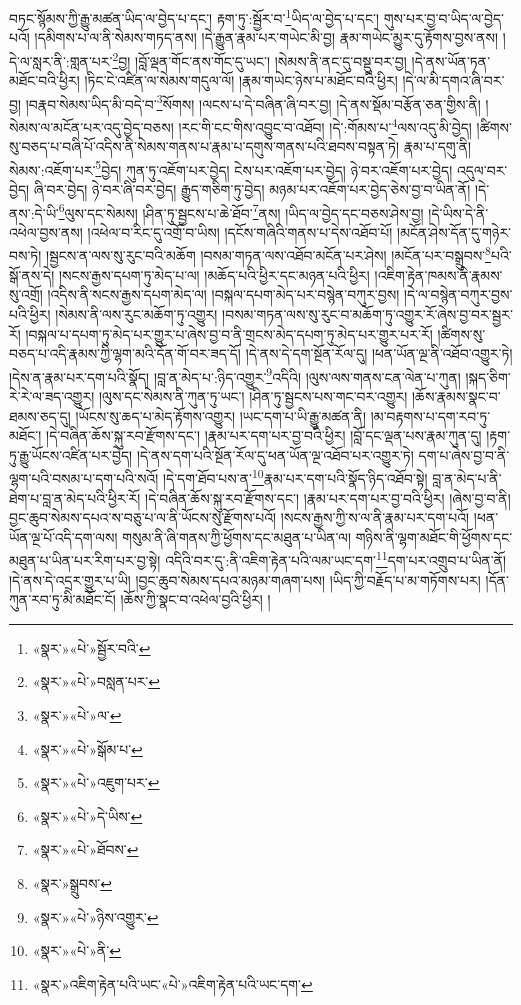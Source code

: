 བཏང་སྙོམས་ཀྱི་རྒྱུ་མཚན་ཡིད་ལ་བྱེད་པ་དང་། རྟག་ཏུ་:སྦྱོར་བ་\footnote{«སྣར་»«པེ་»སྦྱོར་བའི་}ཡིད་ལ་བྱེད་པ་དང་། གུས་པར་བྱ་བ་ཡིད་ལ་བྱེད་པའོ། །དམིགས་པ་ལ་ནི་སེམས་གཏད་ནས། །དེ་རྒྱུན་རྣམ་པར་གཡེང་མི་བྱ། རྣམ་གཡེང་མྱུར་དུ་རྟོགས་བྱས་ནས། །དེ་ལ་སླར་ནི་:གླན་པར་\footnote{«སྣར་»«པེ་»བསླན་པར་}བྱ། །བློ་ལྡན་གོང་ནས་གོང་དུ་ཡང་། །སེམས་ནི་ནང་དུ་བསྡུ་བར་བྱ། །དེ་ནས་ཡོན་ཏན་མཐོང་བའི་ཕྱིར། །ཏིང་ངེ་འཛིན་ལ་སེམས་གདུལ་ལོ། །རྣམ་གཡེང་ཉེས་པ་མཐོང་བའི་ཕྱིར། །དེ་ལ་མི་དགའ་ཞི་བར་བྱ། །བརྣབ་སེམས་ཡིད་མི་བདེ་བ་\footnote{«སྣར་»«པེ་»ལ་}སོགས། །ལངས་པ་དེ་བཞིན་ཞི་བར་བྱ། །དེ་ནས་སྡོམ་བརྩོན་ཅན་གྱིས་ནི། །
སེམས་ལ་མངོན་པར་འདུ་བྱེད་བཅས། །རང་གི་ངང་གིས་འབྱུང་བ་འཐོབ། །དེ་:གོམས་པ་\footnote{«སྣར་»«པེ་»སྒོམ་པ་}ལས་འདུ་མི་བྱེད། །ཚིགས་སུ་བཅད་པ་བཞི་པོ་འདིས་ནི་སེམས་གནས་པ་རྣམ་པ་དགུས་གནས་པའི་ཐབས་བསྟན་ཏེ། རྣམ་པ་དགུ་ནི། སེམས་:འཇོག་པར་\footnote{«སྣར་»«པེ་»འཇུག་པར་}བྱེད། ཀུན་ཏུ་འཇོག་པར་བྱེད། ངེས་པར་འཇོག་པར་བྱེད། ཉེ་བར་འཇོག་པར་བྱེད། འདུལ་བར་བྱེད། ཞི་བར་བྱེད། ཉེ་བར་ཞི་བར་བྱེད། རྒྱུད་གཅིག་ཏུ་བྱེད། མཉམ་པར་འཇོག་པར་བྱེད་ཅེས་བྱ་བ་ཡིན་ནོ། །དེ་ནས་:དེ་ཡི་\footnote{«སྣར་»«པེ་»དེ་ཡིས་}ལུས་དང་སེམས། །ཤིན་ཏུ་སྦྱངས་པ་ཆེ་ཐོབ་\footnote{«སྣར་»«པེ་»ཐོབས་}ནས། །ཡིད་ལ་བྱེད་དང་བཅས་ཤེས་བྱ། །དེ་ཡིས་དེ་ནི་འཕེལ་བྱས་ནས། །འཕེལ་བ་རིང་དུ་འགྲོ་བ་ཡིས། །དངོས་གཞིའི་གནས་པ་དེས་འཐོབ་པོ། །མངོན་ཤེས་དོན་དུ་གཉེར་བས་ཏེ། །སྦྱངས་ན་ལས་སུ་རུང་བའི་མཆོག །བསམ་གཏན་ལས་འཐོབ་མངོན་པར་ཤེས། །མངོན་པར་བསྒྲུབས་\footnote{«སྣར་»སྒྲུབས་}པའི་སྒོ་ནས་དེ། །སངས་རྒྱས་དཔག་ཏུ་མེད་པ་ལ། །མཆོད་པའི་ཕྱིར་དང་མཉན་པའི་ཕྱིར། །འཇིག་རྟེན་ཁམས་ནི་རྣམས་སུ་འགྲོ། །འདིས་ནི་སངས་རྒྱས་དཔག་མེད་ལ། །བསྐལ་དཔག་མེད་པར་བསྙེན་བཀུར་བྱས། །དེ་ལ་བསྙེན་བཀུར་བྱས་པའི་ཕྱིར། །སེམས་ནི་ལས་རུང་མཆོག་ཏུ་འགྱུར། །བསམ་གཏན་ལས་སུ་རུང་བ་མཆོག་ཏུ་འགྱུར་རོ་ཞེས་བྱ་བར་སྦྱར་རོ། །བསྐལ་པ་དཔག་ཏུ་མེད་པར་གྱུར་པ་ཞེས་བྱ་བ་ནི་གྲངས་མེད་དཔག་ཏུ་མེད་པར་གྱུར་པར་རོ། །ཚིགས་སུ་བཅད་པ་འདི་རྣམས་ཀྱི་ལྷག་མའི་དོན་གོ་བར་ཟད་དོ། །དེ་ནས་དེ་དག་སྔོན་རོལ་དུ། །ཕན་ཡོན་ལྔ་ནི་འཐོབ་འགྱུར་ཏེ། །དེས་ན་རྣམ་པར་དག་པའི་སྣོད། །བླ་ན་མེད་པ་:ཉིད་འགྱུར་\footnote{«སྣར་»«པེ་»ཉིས་འགྱུར་}འདིའི། །ལུས་ལས་གནས་ངན་ལེན་པ་ཀུན། །སྐད་ཅིག་རེ་རེ་ལ་ཟད་འགྱུར། །ལུས་དང་སེམས་ནི་ཀུན་ཏུ་ཡང་། །ཤིན་ཏུ་སྦྱངས་པས་གང་བར་འགྱུར། །ཆོས་རྣམས་སྣང་བ་ཐམས་ཅད་དུ། །ཡོངས་སུ་ཆད་པ་མེད་རྟོགས་འགྱུར། །ཡང་དག་པ་ཡི་རྒྱུ་མཚན་ནི། །མ་བརྟགས་པ་དག་རབ་ཏུ་མཐོང་། །དེ་བཞིན་ཆོས་སྐུ་རབ་རྫོགས་དང་། །རྣམ་པར་དག་པར་བྱ་བའི་ཕྱིར། །བློ་དང་ལྡན་པས་རྣམ་ཀུན་དུ། །རྟག་ཏུ་རྒྱུ་ཡོངས་འཛིན་པར་བྱེད། །དེ་ནས་དག་པའི་སྔོན་རོལ་དུ་ཕན་ཡོན་ལྔ་འཐོབ་པར་འགྱུར་ཏེ། དག་པ་ཞེས་བྱ་བ་ནི་ལྷག་པའི་བསམ་པ་དག་པའི་སའོ། །དེ་དག་ཐོབ་པས་ན་\footnote{«སྣར་»«པེ་»ནི་}རྣམ་པར་དག་པའི་སྣོད་ཉིད་འཐོབ་སྟེ། བླ་ན་མེད་པ་ནི་ཐེག་པ་བླ་ན་མེད་པའི་ཕྱིར་རོ། །དེ་བཞིན་ཆོས་སྐུ་རབ་རྫོགས་དང་། །རྣམ་པར་དག་པར་བྱ་བའི་ཕྱིར། །ཞེས་བྱ་བ་ནི། བྱང་ཆུབ་སེམས་དཔའ་ས་བཅུ་པ་ལ་ནི་ཡོངས་སུ་རྫོགས་པའོ། །སངས་རྒྱས་ཀྱི་ས་ལ་ནི་རྣམ་པར་དག་པའོ། །ཕན་ཡོན་ལྔ་པོ་འདི་དག་ལས། གསུམ་ནི་ཞི་གནས་ཀྱི་ཕྱོགས་དང་མཐུན་པ་ཡིན་ལ། གཉིས་ནི་ལྷག་མཐོང་གི་ཕྱོགས་དང་མཐུན་པ་ཡིན་པར་རིག་པར་བྱ་སྟེ། འདིའི་བར་དུ་:ནི་འཇིག་རྟེན་པའི་ལམ་ཡང་དག་\footnote{«སྣར་»འཇིག་རྟེན་པའི་ཡང་«པེ་»འཇིག་རྟེན་པའི་ཡང་དག་}དག་པར་འགྲུབ་པ་ཡིན་ནོ། །དེ་ནས་དེ་འདྲར་གྱུར་པ་ཡི། །བྱང་ཆུབ་སེམས་དཔའ་མཉམ་གཞག་པས། །ཡིད་ཀྱི་བརྗོད་པ་མ་གཏོགས་པར། །དོན་ཀུན་རབ་ཏུ་མི་མཐོང་ངོ། །ཆོས་ཀྱི་སྣང་བ་འཕེལ་བྱའི་ཕྱིར། །
